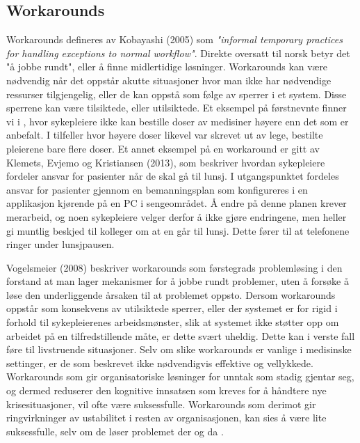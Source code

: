 \subsection{Workarounds}
\label{chp: workarounds}

Workarounds defineres av Kobayashi (2005) som \emph{"informal temporary practices for handling exceptions to normal workflow"}. Direkte oversatt til norsk betyr det "å jobbe rundt", eller å finne midlertidige løsninger.
\noindent
Workarounds kan være nødvendig når det oppstår akutte situasjoner hvor man ikke har nødvendige ressurser tilgjengelig, eller de kan oppstå som følge av sperrer i et system. Disse sperrene kan være tilsiktede, eller utilsiktede. Et eksempel på førstnevnte finner vi i \cite{Vogelsmeier08}, hvor sykepleiere ikke kan bestille doser av medisiner høyere enn det som er anbefalt. I tilfeller hvor høyere doser likevel var skrevet ut av lege, bestilte pleierene bare flere doser. 
Et annet eksempel på en workaround er gitt av Klemets, Evjemo og Kristiansen (2013), som beskriver hvordan sykepleiere fordeler ansvar for pasienter når de skal gå til lunsj. I utgangspunktet fordeles ansvar for pasienter gjennom en bemanningsplan som konfigureres i en applikasjon kjørende på en PC i sengeområdet. Å endre på denne planen krever merarbeid, og noen sykepleiere velger derfor å ikke gjøre endringene, men heller gi muntlig beskjed til kolleger om at en går til lunsj. Dette fører til at telefonene ringer under lunsjpausen.

\noindent
Vogelsmeier (2008) beskriver workarounds som førstegrads problemløsing i den forstand at man lager mekanismer for å jobbe rundt problemer, uten å forsøke å løse den underliggende årsaken til at problemet oppsto.
Dersom workarounds oppstår som konsekvens av utilsiktede sperrer, eller der systemet er for rigid i forhold til sykepleierenes arbeidsmønster, slik at systemet ikke støtter opp om arbeidet på en tilfredstillende måte, er dette svært uheldig. Dette kan i verste fall føre til livstruende situasjoner.
Selv om slike workarounds er vanlige i medisinske settinger, er de som beskrevet ikke nødvendigvis effektive og vellykkede. Workarounds som gir organisatoriske løsninger for unntak som stadig gjentar seg, og dermed reduserer den kognitive innsatsen som kreves for å håndtere nye krisesituasjoner, vil ofte være suksessfulle. Workarounds som derimot gir ringvirkninger av ustabilitet i resten av organisasjonen, kan sies å være lite suksessfulle, selv om de løser problemet der og da \cite{Kobayashi05}.